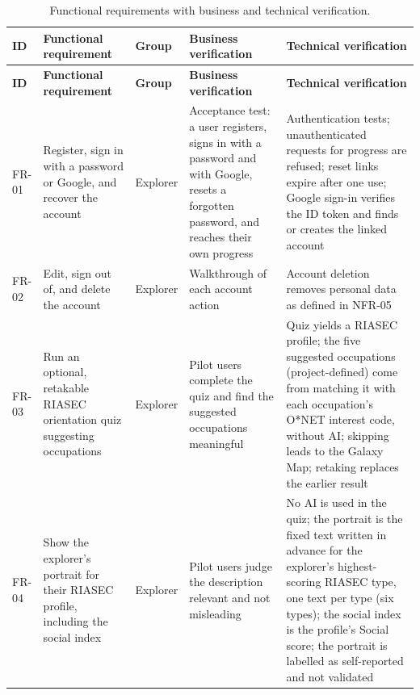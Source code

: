 {\small
\begin{longtable}{|>{\raggedright\arraybackslash}p{}|>{\raggedright\arraybackslash}p{}|>{\raggedright\arraybackslash}p{}|>{\raggedright\arraybackslash}p{}|>{\raggedright\arraybackslash}p{}|}
\caption{Functional requirements with business and technical verification.} \\
\hline
\textbf{ID} & \textbf{Functional requirement} & \textbf{Group} & \textbf{Business verification} & \textbf{Technical verification} \\ \hline
\endfirsthead
\hline
\textbf{ID} & \textbf{Functional requirement} & \textbf{Group} & \textbf{Business verification} & \textbf{Technical verification} \\ \hline
\endhead
FR-01 & Register, sign in with a password or Google, and recover the account & Explorer & Acceptance test: a user registers, signs in with a password and with Google, resets a forgotten password, and reaches their own progress & Authentication tests; unauthenticated requests for progress are refused; reset links expire after one use; Google sign-in verifies the ID token and finds or creates the linked account \\ \hline
FR-02 & Edit, sign out of, and delete the account & Explorer & Walkthrough of each account action & Account deletion removes personal data as defined in NFR-05 \\ \hline
FR-03 & Run an optional, retakable RIASEC orientation quiz suggesting occupations\cite{r41} & Explorer & Pilot users complete the quiz and find the suggested occupations meaningful & Quiz yields a RIASEC profile; the five suggested occupations (project-defined) come from matching it with each occupation's O*NET interest code, without AI; skipping leads to the Galaxy Map; retaking replaces the earlier result \\ \hline
FR-04 & Show the explorer's portrait for their RIASEC profile, including the social index & Explorer & Pilot users judge the description relevant and not misleading & No AI is used in the quiz; the portrait is the fixed text written in advance for the explorer's highest-scoring RIASEC type, one text per type (six types\cite{r41}); the social index is the profile's Social score; the portrait is labelled as self-reported and not validated \\ \hline

\end{longtable}}

